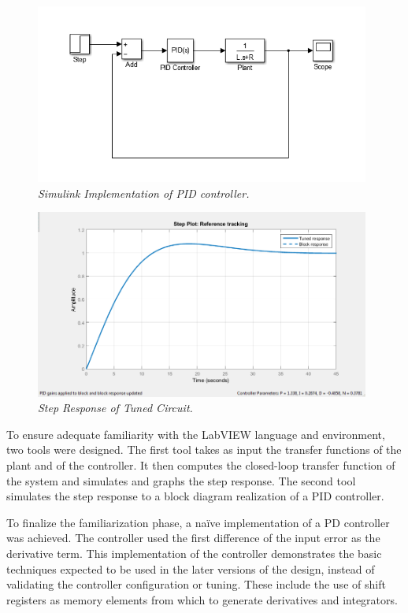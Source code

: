 \documentclass{article}
\begin{document}
\begin{figure}[!ht]
\centering 
\includegraphics[width=11cm]{fig_9.png}
\caption{\small \sl Simulink Implementation of PID controller.}  
\end{figure}

\begin{figure}[!ht]
\centering 
\includegraphics[width=11cm]{fig_10.png}
\caption{\small \sl Step Response of Tuned Circuit.}  
\end{figure}

\begin{flushleft}
To ensure adequate familiarity with the LabVIEW language and environment, two tools were designed. The first tool takes as input the transfer functions of the plant and of the controller. It then computes the closed-loop transfer function of the system and simulates and graphs the step response. The second tool simulates the step response to a block diagram realization of a PID controller. 
\end{flushleft}

\begin{flushleft}
To finalize the familiarization phase, a naïve implementation of a PD controller was achieved. The controller used the first difference of the input error as the derivative term. This implementation of the controller demonstrates the basic techniques expected to be used in the later versions of the design, instead of validating the controller configuration or tuning. These include the use of shift registers as memory elements from which to generate derivatives and integrators. 
\end{flushleft}
\end{document}
